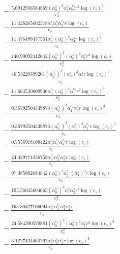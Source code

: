\documentclass[10pt]{article}
\begin{document}
\begin{align*}
&{}  - \frac{5.6912936584869 \left(\alpha_{0}^s\right)^{2} \alpha_{1}^s \alpha_{2}^{c_s} r^{2} \log{\left(c_{s} \right)}^{3}}{c_{s}^{2}} \\
&{}  - \frac{11.428265602378 \alpha_{0}^s \alpha_{1}^s \alpha_{4}^{c_s} r \log{\left(c_{s} \right)}}{c_{s}} \\
&{}  - \frac{11.476499457561 \alpha_{0}^{c_s} \left(\alpha_{0}^s\right)^{2} \alpha_{4}^s r \log{\left(c_{s} \right)}^{2}}{c_{s}} \\
&{}  - \frac{740.90092412642 \left(\alpha_{0}^{c_s}\right)^{3} \left(\alpha_{0}^s\right)^{2} \alpha_{1}^s r^{2} \log{\left(c_{s} \right)}}{c_{s}^{2}} \\
&{}  - \frac{46.53220399201 \left(\alpha_{0}^{c_s}\right)^{2} \left(\alpha_{0}^s\right)^{3} \alpha_{2}^s r \log{\left(c_{s} \right)}^{2}}{c_{s}} \\
&{}  - \frac{11.663530609936 \alpha_{0}^{c_s} \left(\alpha_{0}^s\right)^{4} \alpha_{1}^{c_s} r^{2} \log{\left(c_{s} \right)}^{3}}{c_{s}^{2}} \\
&{}  - \frac{0.36792504339873 \left(\alpha_{0}^{c_s}\right)^{3} \alpha_{1}^{c_s} \alpha_{2}^s r \log{\left(c_{s} \right)}^{3}}{c_{s}} \\
&{}  - \frac{0.36792504339873 \left(\alpha_{0}^{c_s}\right)^{3} \left(\alpha_{0}^s\right)^{3} \alpha_{1}^{c_s} r \log{\left(c_{s} \right)}^{3}}{c_{s}} \\
&{}  - \frac{0.7556918108422 \alpha_{0}^s \alpha_{1}^{c_s} \alpha_{4}^{c_s} r \log{\left(c_{s} \right)}}{c_{s}} \\
&{}  - \frac{24.329771236758 \alpha_{0}^{c_s} \alpha_{2}^{c_s} \alpha_{3}^s r \log{\left(c_{s} \right)}}{c_{s}} \\
&{}  - \frac{97.385802684842 \left(\alpha_{0}^s\right)^{2} \alpha_{1}^{c_s} \left(\alpha_{1}^s\right)^{2} r \log{\left(c_{s} \right)}}{c_{s}} \\
&{}  - \frac{195.56045604663 \left(\alpha_{0}^{c_s}\right)^{2} \alpha_{1}^s \alpha_{2}^s r^{2} \log{\left(c_{s} \right)}}{c_{s}^{2}} \\
&{}  - \frac{195.80427106094 \alpha_{0}^{c_s} \alpha_{1}^{c_s} \alpha_{1}^s \alpha_{2}^s r}{c_{s}} \\
&{}  - \frac{24.584390579881 \left(\alpha_{0}^{c_s}\right)^{3} \left(\alpha_{0}^s\right)^{2} \alpha_{1}^s r^{2} \log{\left(c_{s} \right)}^{3}}{c_{s}^{2}} \\
&{}  - \frac{3.1227424460262 \alpha_{0}^s \alpha_{1}^s \alpha_{4}^s r \log{\left(c_{s} \right)}^{3}}{c_{s}} \\

\end{align*}
\end{document}
